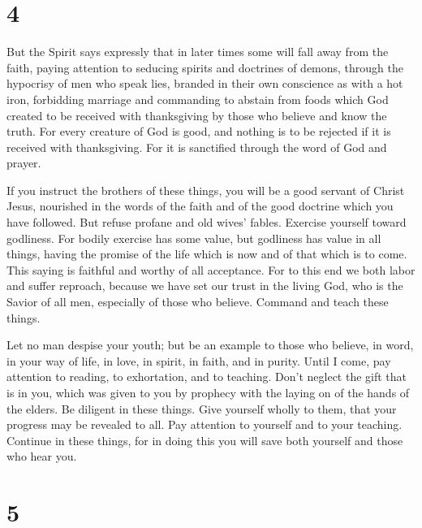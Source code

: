 \hypertarget{section-3}{%
\section{4}\label{section-3}}

 But the Spirit says expressly that in later times some
will fall away from the faith, paying attention to seducing spirits and
doctrines of demons,  through the hypocrisy of men who
speak lies, branded in their own conscience as with a hot iron,
 forbidding marriage and commanding to abstain from foods
which God created to be received with thanksgiving by those who believe
and know the truth.  For every creature of God is good,
and nothing is to be rejected if it is received with thanksgiving.
 For it is sanctified through the word of God and prayer.

 If you instruct the brothers of these things, you will be
a good servant of Christ Jesus, nourished in the words of the faith and
of the good doctrine which you have followed.  But refuse
profane and old wives' fables. Exercise yourself toward godliness.
 For bodily exercise has some value, but godliness has
value in all things, having the promise of the life which is now and of
that which is to come.  This saying is faithful and worthy
of all acceptance.  For to this end we both labor and
suffer reproach, because we have set our trust in the living God, who is
the Savior of all men, especially of those who believe. 
Command and teach these things.

 Let no man despise your youth; but be an example to
those who believe, in word, in your way of life, in love, in spirit, in
faith, and in purity.  Until I come, pay attention to
reading, to exhortation, and to teaching.  Don't neglect
the gift that is in you, which was given to you by prophecy with the
laying on of the hands of the elders.  Be diligent in
these things. Give yourself wholly to them, that your progress may be
revealed to all.  Pay attention to yourself and to your
teaching. Continue in these things, for in doing this you will save both
yourself and those who hear you.

\hypertarget{section-4}{%
\section{5}\label{section-4}}

